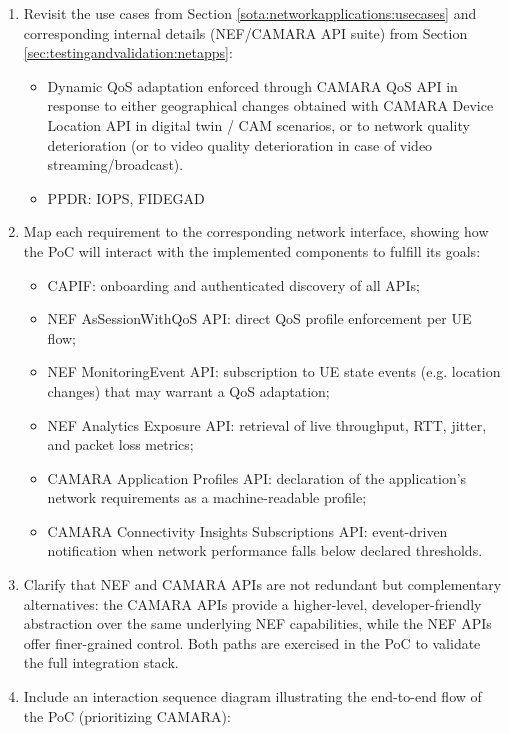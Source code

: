 {\begin{enumerate}
        \item Revisit the use cases from Section \ref{sota:networkapplications:usecases} and corresponding internal details (\acs{NEF}/CAMARA \acs{API} suite) from Section \ref{sec:testingandvalidation:netapps}:
        \begin{itemize}
            \item Dynamic \acs{QoS} adaptation enforced through CAMARA \acs{QoS} \acs{API} in response to either geographical changes obtained with CAMARA Device Location \acs{API} in digital twin / \acs{CAM} scenarios, or to network quality deterioration (or to video quality deterioration in case of video streaming/broadcast).
            \item \acs{PPDR}: \acs{IOPS}, \acs{FIDEGAD}
        \end{itemize}
        \item Map each requirement to the corresponding network interface, showing how the PoC will interact with the implemented components to fulfill its goals:
        \begin{itemize}
            \item CAPIF: onboarding and authenticated discovery of all APIs;
            \item NEF AsSessionWithQoS API: direct QoS profile enforcement per UE flow;
            \item NEF MonitoringEvent API: subscription to UE state events (e.g. location changes) that may warrant a QoS adaptation;
            \item NEF Analytics Exposure API: retrieval of live throughput, RTT, jitter, and packet loss metrics;
            \item CAMARA Application Profiles API: declaration of the application's network requirements as a machine-readable profile;
            \item CAMARA Connectivity Insights Subscriptions API: event-driven notification when network performance falls below declared thresholds.
        \end{itemize}
        \item Clarify that NEF and CAMARA APIs are not redundant but complementary alternatives: the CAMARA APIs provide a higher-level, developer-friendly abstraction over the same underlying NEF capabilities, while the NEF APIs offer finer-grained control. Both paths are exercised in the PoC to validate the full integration stack.
        \item Include an interaction sequence diagram illustrating the end-to-end flow of the PoC (prioritizing CAMARA):

\end{enumerate}}
